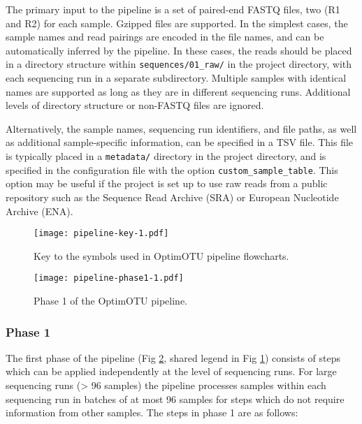 \documentclass[
]{article}
\begin{document}
The primary input to the pipeline is a set of paired-end FASTQ files, two (R1 and R2) for each sample.
Gzipped files are supported.
In the simplest cases, the sample names and read pairings are encoded in the file names, and can be automatically inferred by the pipeline.
In these cases, the reads should be placed in a directory structure within \texttt{sequences/01\_raw/} in the project directory, with each sequencing run in a separate subdirectory.
Multiple samples with identical names are supported as long as they are in different sequencing runs.
Additional levels of directory structure or non-FASTQ files are ignored.

Alternatively, the sample names, sequencing run identifiers, and file paths, as well as additional sample-specific information, can be specified in a TSV file.
This file is typically placed in a \texttt{metadata/} directory in the project directory, and is specified in the configuration file with the option \texttt{custom\_sample\_table}.
This option may be useful if the project is set up to use raw reads from a public repository such as the Sequence Read Archive (SRA) or European Nucleotide Archive (ENA).

\begin{figure}
\centering
\texttt{[image: pipeline-key-1.pdf]}
\caption{\label{fig:pipeline-key}Key to the symbols used in OptimOTU pipeline flowcharts.}
\end{figure}

\begin{figure}
\centering
\texttt{[image: pipeline-phase1-1.pdf]}
\caption{\label{fig:pipeline-phase1}Phase 1 of the OptimOTU pipeline.}
\end{figure}

\subsubsection{Phase 1}\label{phase-1}

The first phase of the pipeline (Fig \ref{fig:pipeline-phase1}, shared legend in Fig \ref{fig:pipeline-key}) consists of steps which can be applied independently at the level of sequencing runs.
For large sequencing runs (\textgreater{} 96 samples) the pipeline processes samples within each sequencing run in batches of at most 96 samples for steps which do not require information from other samples.
The steps in phase 1 are as follows:
\end{document}
